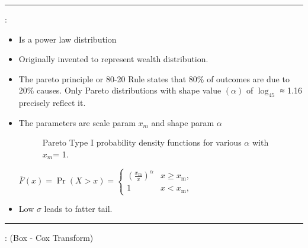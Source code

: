 \documentclass[	DIV=calc,%
paper=a4,%
fontsize=11pt,%
twocolumn]{scrartcl} %
\newcommand{\hformbar}[1]{\vspace{5pt}\hrule\vspace{10pt}} %
\newcommand{\formdesc}[1]{\noindent\textbf{#1}}
\begin{document}
\hformbar

\formdesc{Pareto distribution}:
	\begin{itemize}
		\item Is a power law distribution
		\item Originally invented to represent wealth distribution. 
		\item The pareto principle or 80-20 Rule states that 80\% of outcomes are due to 20\% causes. Only Pareto distributions with shape value $(\alpha)$ of $\log_45$ ≈ 1.16 precisely reflect it. 
		\item The parameters are scale param $x_m$ and shape param $\alpha$
			\begin{figure}[ht!]
			\centering
			\graphicspath{ {images/math/} }
			\caption{Pareto Type I probability density functions for various $\alpha$ with $x_m$= 1. }
			
		\end{figure}
	
	\begin{math}
		{\displaystyle {\overline {F}}(x)=\Pr(X>x)={\begin{cases}\left({\frac {x_{\mathrm {m} }}{x}}\right)^{\alpha }&x\geq x_{\mathrm {m} },\\1&x<x_{\mathrm {m} },\end{cases}}}
	\end{math}

	\item Low $\sigma$ leads to fatter tail.
	
	\end{itemize}


\hformbar

\formdesc{Power Transform}: (Box - Cox Transform)
\end{document}
